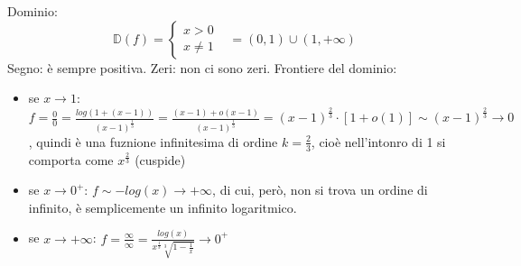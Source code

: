 Dominio:
\[
    \mathbb{D}(f) = \begin{cases}
        x >0 & \\
        x \neq 1 &
    \end{cases} = (0,1) \cup(1, + \infty)
\]
Segno:
\newline
è sempre positiva.
\newline
Zeri:
\newline
non ci sono zeri.
\newline
Frontiere del dominio:
\begin{itemize}
    \item se $x \rightarrow 1$: $ f= \frac{0}{0} = \frac{log(1+(x-1))}{(x-1)^{\frac{1}{3}}} = \frac{(x-1)+ o(x-1)}{(x-1)^{\frac{1}{3}}}= (x-1)^{\frac{2}{3}} \cdot [1+o(1)] \sim (x-1)^{\frac{2}{3}} \rightarrow 0$, quindi è una fuznione infinitesima di ordine $k = \frac{2}{3}$, cioè nell'intonro di 1 si comporta come $x^{\frac{2}{3}}$ (cuspide)
    \item se $x \rightarrow 0^+$: $f \sim -log(x) \rightarrow + \infty$, di cui, però, non si trova un ordine di infinito, è semplicemente un infinito logaritmico.
    \item se $x \rightarrow  +\infty$: $f=\frac{\infty}{\infty}= \frac{log(x)}{x^{\frac{1}{3}}\sqrt[3]{1-\frac{1}{x}}} \rightarrow 0^+$
\end{itemize}


\newpage